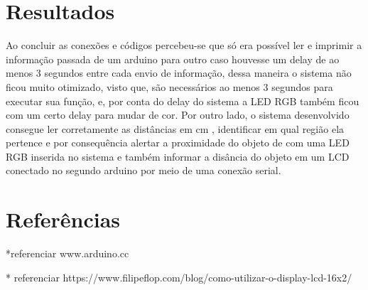 \documentclass[conference]{IEEEtran}
\begin{document}
\section{Resultados}
 Ao concluir as conexões e códigos percebeu-se que só era possível ler e imprimir a informação passada de um arduino para outro caso houvesse um delay de ao menos 3 segundos
 entre cada envio de informação, dessa maneira o sistema não ficou muito otimizado, visto que, são necessários ao menos 3 segundos para executar sua função, e, por conta
 do delay do sistema a LED RGB também ficou com um certo delay para mudar de cor. Por outro lado, o sistema desenvolvido consegue ler corretamente as distâncias em cm 
 , identificar em qual região ela pertence e por consequência alertar a proximidade do objeto de com uma LED RGB inserida no sistema e também informar a disância do objeto
 em um LCD conectado no segundo arduino por meio de uma conexão serial.

\section*{Referências}

*referenciar www.arduino.cc

* referenciar https://www.filipeflop.com/blog/como-utilizar-o-display-lcd-16x2/
\end{document}
